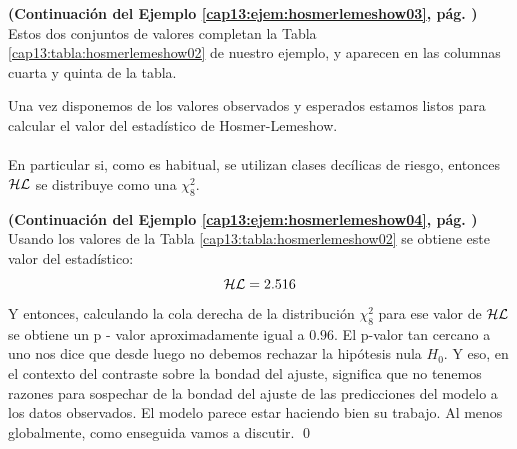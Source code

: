 \begin{enumerate}
    \begin{ejemplo}
    \label{cap13:ejem:hosmerlemeshow04}
    {\bf (Continuación del Ejemplo \ref{cap13:ejem:hosmerlemeshow03}, pág. \pageref{cap13:ejem:hosmerlemeshow03})}
    Estos dos conjuntos de valores completan la Tabla \ref{cap13:tabla:hosmerlemeshow02} de nuestro ejemplo, y aparecen en las columnas cuarta y quinta de la tabla.
    \end{ejemplo}

\end{enumerate}
Una vez disponemos de los valores observados y esperados estamos listos para calcular el valor del estadístico de Hosmer-Lemeshow. \\[3mm]
\\[3mm]
En particular si, como es habitual, se utilizan clases decílicas de riesgo,  entonces ${\cal HL}$ se distribuye como una $\chi^2_8$.

\begin{ejemplo}
\label{cap13:ejem:hosmerlemeshow05}
{\bf (Continuación del Ejemplo \ref{cap13:ejem:hosmerlemeshow04}, pág. \pageref{cap13:ejem:hosmerlemeshow04})}
Usando los valores  de la Tabla \ref{cap13:tabla:hosmerlemeshow02}  se obtiene este valor del estadístico:
\[
{\cal HL} = 2.516
\]
Y entonces, calculando la cola derecha de la distribución $\chi^2_8$ para ese valor de ${\cal HL}$ se obtiene un p - valor aproximadamente igual a $0.96$. El p-valor tan cercano a uno nos dice que desde luego no debemos rechazar la hipótesis nula $H_0$. Y eso, en el contexto del contraste sobre la bondad del ajuste, significa que no tenemos razones para sospechar de la bondad del ajuste de las predicciones del modelo a los datos observados. El modelo parece estar haciendo bien su trabajo. Al menos globalmente, como enseguida vamos a discutir.
\qed
\end{ejemplo}

